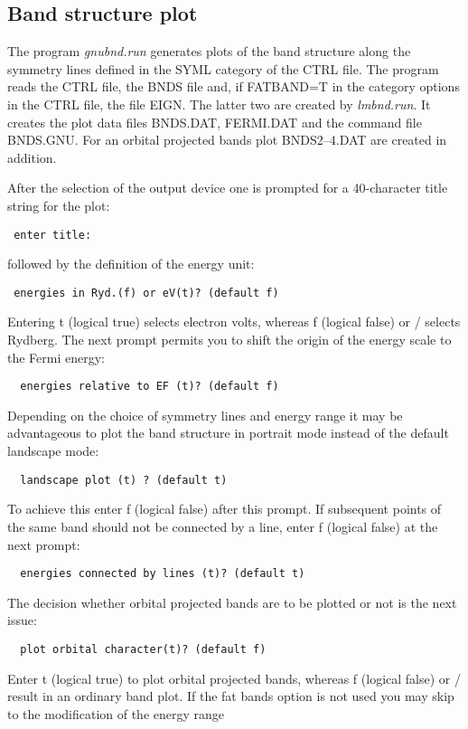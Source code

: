 \documentclass[aps,twocolumn,a4]{revtex4}
\begin{document}
\subsection {Band structure plot}
\label{bandplot}

The program {\it gnubnd.run} generates plots of the band structure along the
symmetry lines defined in the SYML category of the CTRL file.
The program reads the CTRL file, the BNDS file and, if FATBAND=T in the
category options in the CTRL file,
the file EIGN. The latter two are created by
{\it lmbnd.run}. It creates the plot data files BNDS.DAT, FERMI.DAT and the
command file BNDS.GNU. For an orbital projected bands plot BNDS2--4.DAT
are created in addition.

After the selection of the output device one is prompted for a
40-character title string for the plot:
\begin{verbatim}
 enter title:
\end{verbatim}
followed by the definition of the energy unit:
\begin{verbatim}
 energies in Ryd.(f) or eV(t)? (default f)
\end{verbatim}
Entering t (logical true) selects electron volts, whereas f (logical false) or
/ selects Rydberg. The next prompt permits you to shift the origin of
the energy scale to the Fermi energy:
\begin{verbatim}
  energies relative to EF (t)? (default f)
\end{verbatim}
Depending on the choice of symmetry lines and energy range it may be
advantageous to plot the band structure in portrait mode instead of the
default landscape mode:
\begin{verbatim}
  landscape plot (t) ? (default t)
\end{verbatim}
To achieve this enter f (logical false) after this prompt. If
subsequent points of the same band should not be connected by a line,
enter f (logical false) at the next prompt:
\begin{verbatim}
  energies connected by lines (t)? (default t)
\end{verbatim}
The decision whether orbital projected bands are to be plotted or not is
the next issue:
\begin{verbatim}
  plot orbital character(t)? (default f)
\end{verbatim}
Enter t (logical true) to plot orbital projected bands, whereas f
(logical false) or / result in an ordinary band plot. If the fat bands
option is not used you may skip to the modification of the energy range
\end{document}
